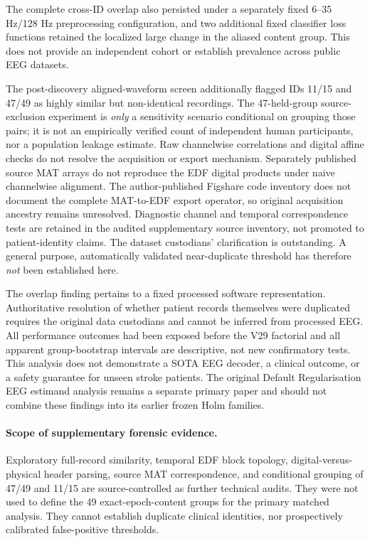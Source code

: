 \documentclass[11pt,a4paper]{article}
\begin{document}
The complete cross-ID overlap also persisted under a separately fixed
6--35 Hz/128 Hz preprocessing configuration, and two additional fixed
classifier loss functions retained the localized large change in the
aliased content group. This does not provide an independent cohort or
establish prevalence across public EEG datasets.

The post-discovery aligned-waveform screen additionally flagged
IDs 11/15 and 47/49 as highly similar but non-identical
recordings. The 47-held-group source-exclusion experiment is
\emph{only} a sensitivity scenario conditional on grouping
those pairs; it is not an empirically verified count of
independent human participants, nor a population leakage
estimate. Raw channelwise correlations and digital affine
checks do not resolve the acquisition or export mechanism.
Separately published source MAT arrays do not reproduce the
EDF digital products under naive channelwise alignment. The
author-published Figshare code inventory does not document the
complete MAT-to-EDF export operator, so original acquisition
ancestry remains unresolved. Diagnostic channel and temporal
correspondence tests are retained in the audited supplementary
source inventory, not promoted to patient-identity claims.
The dataset custodians' clarification is outstanding.
A general purpose, automatically validated near-duplicate
threshold has therefore \emph{not} been established here.

The overlap finding pertains to a fixed processed software
representation. Authoritative resolution of whether patient
records themselves were duplicated requires the original
data custodians and cannot be inferred from processed EEG.
All performance outcomes had been exposed before the V29
factorial and all apparent group-bootstrap intervals are
descriptive, not new confirmatory tests. This analysis does
not demonstrate a SOTA EEG decoder, a clinical outcome, or
a safety guarantee for unseen stroke patients. The
original Default Regularisation EEG estimand analysis
remains a separate primary paper and should not combine
these findings into its earlier frozen Holm families.


\paragraph{Scope of supplementary forensic evidence.}
Exploratory full-record similarity, temporal EDF block topology,
digital-versus-physical header parsing, source MAT correspondence,
and conditional grouping of 47/49 and 11/15 are source-controlled
as further technical audits. They were not used to define the
49 exact-epoch-content groups for the primary matched analysis.
They cannot establish duplicate clinical identities, nor
prospectively calibrated false-positive thresholds.
\end{document}
